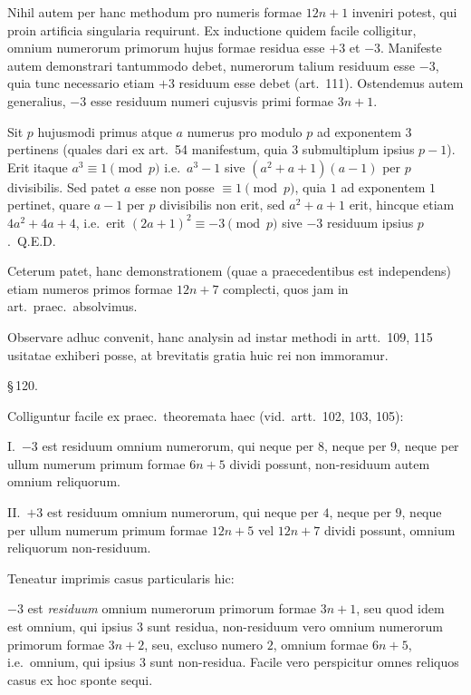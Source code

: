 \documentclass[12pt,a4paper]{article}
\theoremstyle{plain}
\theoremstyle{definition}
\theoremstyle{remark}
\begin{document}
Nihil autem per hanc methodum pro numeris formae $12n+1$ inveniri potest, qui proin artificia singularia requirunt. Ex inductione quidem facile colligitur, omnium numerorum primorum hujus formae residua esse $+3$ et $-3$. Manifeste autem demonstrari tantummodo debet, numerorum talium residuum esse $-3$, quia tunc necessario etiam $+3$ residuum esse debet (art.~111). Ostendemus autem generalius, $-3$ esse residuum numeri cujusvis primi formae $3n+1$.

Sit $p$ hujusmodi primus atque $a$ numerus pro modulo $p$ ad exponentem $3$ pertinens (quales dari ex art.~54 manifestum, quia $3$ submultiplum ipsius $p-1$). Erit itaque $a^3 \equiv 1 \pmod{p}$ i.e.\ $a^3 - 1$ sive $(a^2 + a + 1)(a - 1)$ per $p$ divisibilis. Sed patet $a$ esse non posse $\equiv 1 \pmod{p}$, quia $1$ ad exponentem $1$ pertinet, quare $a - 1$ per $p$ divisibilis non erit, sed $a^2 + a + 1$ erit, hincque etiam $4a^2 + 4a + 4$, i.e.\ erit $(2a+1)^2 \equiv -3 \pmod{p}$ sive $-3$ residuum ipsius $p$.\ Q.E.D.

Ceterum patet, hanc demonstrationem (quae a praecedentibus est independens) etiam numeros primos formae $12n+7$ complecti, quos jam in art.\ praec.\ absolvimus.

Observare adhuc convenit, hanc analysin ad instar methodi in artt.~109, 115 usitatae exhiberi posse, at brevitatis gratia huic rei non immoramur.

\begin{center}\S\,120.\end{center}

Colliguntur facile ex praec.\ theoremata haec (vid.\ artt.~102, 103, 105):

\textsc{I.}\ $-3$ est residuum omnium numerorum, qui neque per $8$, neque per $9$, neque per ullum numerum primum formae $6n+5$ dividi possunt, non-residuum autem omnium reliquorum.

\textsc{II.}\ $+3$ est residuum omnium numerorum, qui neque per $4$, neque per $9$, neque per ullum numerum primum formae $12n+5$ vel $12n+7$ dividi possunt, omnium reliquorum non-residuum.

Teneatur imprimis casus particularis hic:

$-3$ est \emph{residuum} omnium numerorum primorum formae $3n+1$, seu quod idem est omnium, qui ipsius $3$ sunt residua, non-residuum vero omnium numerorum primorum formae $3n+2$, seu, excluso numero $2$, omnium formae $6n+5$, i.e.\ omnium, qui ipsius $3$ sunt non-residua. Facile vero perspicitur omnes reliquos casus ex hoc sponte sequi.
\end{document}
